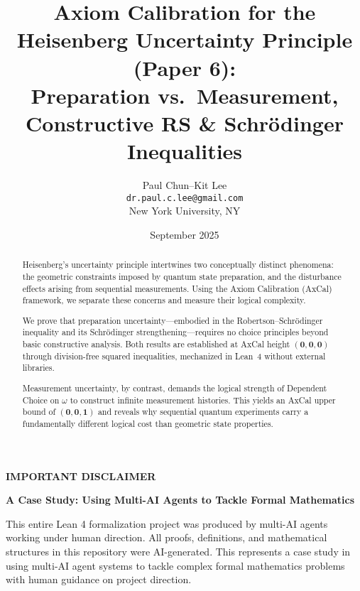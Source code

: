 \documentclass[11pt]{article}
\title{Axiom Calibration for the Heisenberg Uncertainty Principle (Paper 6):\\
Preparation vs.\ Measurement, Constructive RS \& Schrödinger Inequalities}
\author{Paul Chun--Kit Lee\\
\texttt{dr.paul.c.lee@gmail.com}\\
New York University, NY}
\date{September 2025}
\theoremstyle{plain}
\theoremstyle{definition}
\theoremstyle{remark}
\begin{document}
\maketitle

\begin{abstract}
Heisenberg's uncertainty principle intertwines two conceptually distinct phenomena: the geometric constraints imposed by quantum state preparation, and the disturbance effects arising from sequential measurements. Using the Axiom Calibration (AxCal) framework, we separate these concerns and measure their logical complexity.

We prove that preparation uncertainty---embodied in the Robertson--Schrödinger inequality and its Schrödinger strengthening---requires no choice principles beyond basic constructive analysis. Both results are established at AxCal height $(\mathbf{0},\mathbf{0},\mathbf{0})$ through division-free squared inequalities, mechanized in Lean~4 without external libraries.

Measurement uncertainty, by contrast, demands the logical strength of Dependent Choice on $\omega$ to construct infinite measurement histories. This yields an AxCal upper bound of $(\mathbf{0},\mathbf{0},\mathbf{1})$ and reveals why sequential quantum experiments carry a fundamentally different logical cost than geometric state properties.
\end{abstract}

\begin{mdframed}[backgroundcolor=yellow, linewidth=0pt]
\textbf{IMPORTANT DISCLAIMER}

\textbf{A Case Study: Using Multi-AI Agents to Tackle Formal Mathematics}

This entire Lean 4 formalization project was produced by multi-AI agents working under human direction. All proofs, definitions, and mathematical structures in this repository were AI-generated. This represents a case study in using multi-AI agent systems to tackle complex formal mathematics problems with human guidance on project direction.
\end{mdframed}

\tableofcontents

\noindent{}
\end{document}
